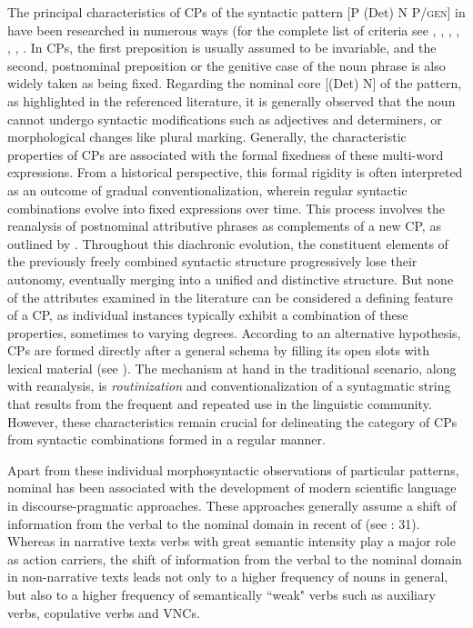 \documentclass[output=paper,colorlinks,citecolor=brown]{langscibook}
\begin{document}
The principal characteristics of CPs of the syntactic pattern [P (Det) N P/\textsc{gen}] in  have been researched in numerous ways (for the complete list of criteria see \citealt[34--35]{Beneš}, \citealt{LehmannStolz1992}, \citealt{Lindqvist1994}, \citealt{Meola2000}, \citealt{Szczepaniak2009}, \citealt{HüningEtAl2020}, \citet{Ruffthc}. In CPs, the first preposition is usually assumed to be invariable, and the second, postnominal preposition or the genitive case of the noun phrase is also widely taken as being fixed. Regarding the nominal core [(Det) N] of the pattern, as highlighted in the referenced literature, it is generally observed that the noun cannot undergo syntactic modifications such as adjectives and determiners, or morphological changes like plural marking. Generally, the characteristic properties of CPs are associated with the formal fixedness of these multi-word expressions. From a historical perspective, this formal rigidity is often interpreted as an outcome of gradual conventionalization, wherein regular syntactic combinations evolve into fixed expressions over time. This process involves the reanalysis of postnominal attributive phrases as complements of a new CP, as outlined by \citet{Lehmann1998}. Throughout this diachronic evolution, the constituent elements of the previously freely combined syntactic structure progressively lose their autonomy, eventually merging into a unified and distinctive structure. But none of the attributes examined in the literature can be considered a defining feature of a CP, as individual instances typically exhibit a combination of these properties, sometimes to varying degrees. According to an alternative hypothesis, CPs are formed directly after a general schema by filling its open slots with lexical material (see \citealt{Hoffmann2005}). The mechanism at hand in the traditional scenario, along with reanalysis, is \textit{routinization} and conventionalization of a syntagmatic string that results from the frequent and repeated use in the linguistic community. However, these characteristics remain crucial for delineating the category of CPs from syntactic combinations formed in a regular manner. 

Apart from these individual morphosyntactic observations of particular patterns,  nominal  has been associated with the development of modern scientific language in discourse-pragmatic approaches. These approaches generally assume a shift of information from the verbal to the nominal domain in recent  of  (see \citealt{Kretzenbacher1994}: 31). Whereas in narrative texts verbs with great semantic intensity play a major role as action carriers, the shift of information from the verbal to the nominal domain in non-narrative texts leads not only to a higher frequency of nouns in general, but also to a higher frequency of semantically ``weak" verbs such as auxiliary verbs, copulative verbs and VNCs. 
\end{document}
